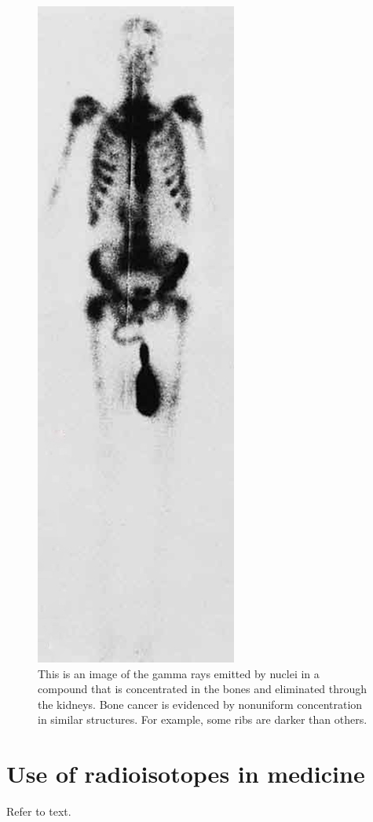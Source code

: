 \documentclass[12pt]{book}
\begin{document}
\begin{figure}
\centering
\includegraphics[scale=0.65]{gamma.jpeg}
\caption{ This is an image of the gamma rays emitted by nuclei in a compound that is concentrated in the bones and eliminated through the kidneys. Bone cancer is evidenced by nonuniform concentration in similar structures. For example, some ribs are darker than others.}
\end{figure}

\section{Use of radioisotopes in medicine}
Refer to text.
\end{document}
